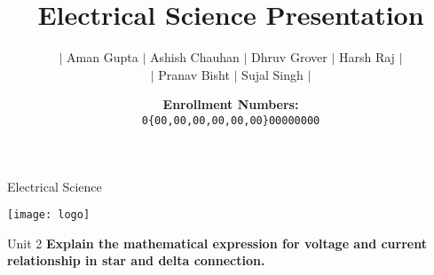 \documentclass[11pt]{beamer}
\title{Electrical Science Presentation}
\author[Aman, Ashish, Dhruv...]{\(|\) Aman Gupta \(|\) Ashish Chauhan \(|\) Dhruv Grover \(|\) Harsh Raj \(|\)\\
    \(|\) Pranav Bisht \(|\) Sujal Singh \(|\)}
\date[Harsh, Pranav, Sujal]{\textbf{Enrollment Numbers:\\}\texttt{0\{00,00,00,00,00,00\}00000000}}
\begin{document}
    \begin{frame}{Electrical Science}
        \begin{center}
            \texttt{[image: logo]}
        \end{center}\vspace*{-10pt}
        \maketitle
    \end{frame}

    \begin{frame}[t]{Unit 2}
        \textbf{\large Explain the mathematical expression for voltage and current relationship in star and delta
        connection.}
    \end{frame}
\end{document}
